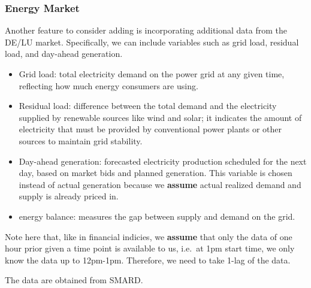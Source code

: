 \documentclass[11pt]{article}
\providecommand{\tightlist}{%
      \setlength{\itemsep}{0pt}\setlength{\parskip}{0pt}}
\begin{document}
    
    
    \subsubsection{\texorpdfstring{{\textbf{Energy
Market}}}{Energy Market}}\label{energy-market}

Another feature to consider adding is incorporating additional data from
the DE/LU market. Specifically, we can include variables such as grid
load, residual load, and day-ahead generation.

\begin{itemize}
\tightlist
\item
  Grid load: total electricity demand on the power grid at any given
  time, reflecting how much energy consumers are using.
\item
  Residual load: difference between the total demand and the electricity
  supplied by renewable sources like wind and solar; it indicates the
  amount of electricity that must be provided by conventional power
  plants or other sources to maintain grid stability.
\item
  Day-ahead generation: forecasted electricity production scheduled for
  the next day, based on market bids and planned generation. This
  variable is chosen instead of actual generation because we
  {\textbf{assume}} actual realized demand and supply is already priced
  in.
\item
  energy balance: measures the gap between supply and demand on the
  grid.
\end{itemize}

Note here that, like in financial indicies, we {\textbf{assume}} that
only the data of one hour prior given a time point is available to us,
i.e.~at 1pm start time, we only know the data up to 12pm-1pm. Therefore,
we need to take 1-lag of the data.

The data are obtained from SMARD.
\end{document}
